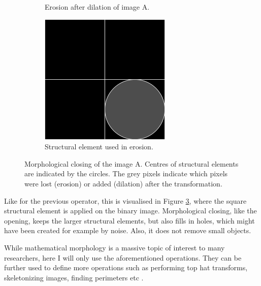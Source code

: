 \documentclass[
  digital,     %
  oneside,     %
  nosansbold,  %
  nocolorbold, %
  lof,         %
  lot,         %
]{fithesis4}
\begin{document}
\begin{figure}
\begin{subfigure}[t]{0.4\textwidth}
        \caption{Erosion after dilation of image A.}
        \label{fig:opening_dilation}
    \end{subfigure}
    \begin{subfigure}[t]{0.2\textwidth}
        \centering
        \includegraphics[width=\textwidth]{resources/inkscape/opening_dilation_se.png}
        \caption{Structural element used in erosion.}
        \label{fig:closing_dilation_se}
    \end{subfigure}
    \caption{Morphological closing of the image A. Centres of structural
    elements are indicated by the circles. The grey pixels indicate which pixels
    were lost (erosion) or added (dilation) after the transformation.}
    \label{fig:closing}
\end{figure}

Like for the previous operator, this is visualised in Figure \ref{fig:closing},
where the square structural element is applied on the binary image.
Morphological closing, like the opening, keeps the larger structural elements,
but also fills in holes, which might have been created for example by noise.
Also, it does not remove small objects.

While mathematical morphology is a massive topic of interest to many
researchers, here I will only use the aforementioned operations. They can be
further used to define more operations such as performing top hat transforms,
skeletonizing images, finding perimeters etc \cite{mathworks_morp_oper}.
\end{document}
